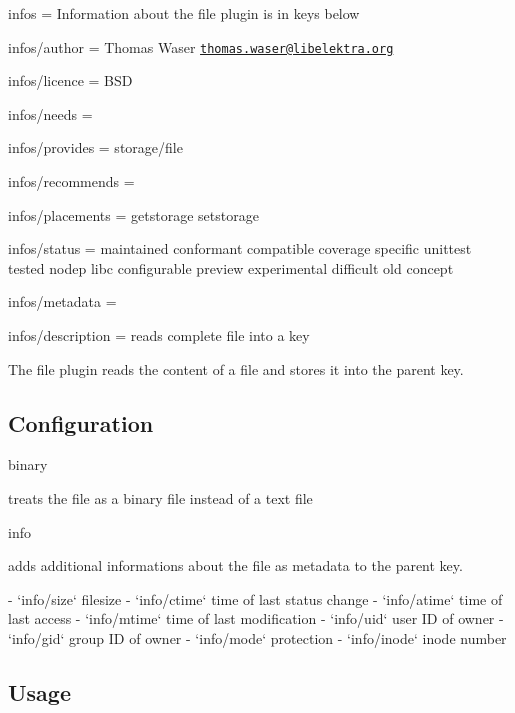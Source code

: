 
\begin{DoxyItemize}
\item infos = Information about the file plugin is in keys below
\item infos/author = Thomas Waser \href{mailto:thomas.waser@libelektra.org}{\tt thomas.\+waser@libelektra.\+org}
\item infos/licence = B\+SD
\item infos/needs =
\item infos/provides = storage/file
\item infos/recommends =
\item infos/placements = getstorage setstorage
\item infos/status = maintained conformant compatible coverage specific unittest tested nodep libc configurable preview experimental difficult old concept
\item infos/metadata =
\item infos/description = reads complete file into a key
\end{DoxyItemize}

The file plugin reads the content of a file and stores it into the parent key.

\subsection*{Configuration}


\begin{DoxyItemize}
\item {\ttfamily binary} \begin{DoxyVerb}  treats the file as a binary file instead of a text file
\end{DoxyVerb}

\item {\ttfamily info} \begin{DoxyVerb}  adds additional informations about the file as metadata to the parent key.

  - `info/size` filesize
  - `info/ctime` time of last status change
  - `info/atime` time of last access
  - `info/mtime` time of last modification
  - `info/uid` user ID of owner
  - `info/gid` group ID of owner
  - `info/mode` protection
  - `info/inode` inode number
\end{DoxyVerb}

\end{DoxyItemize}

\subsection*{Usage}

